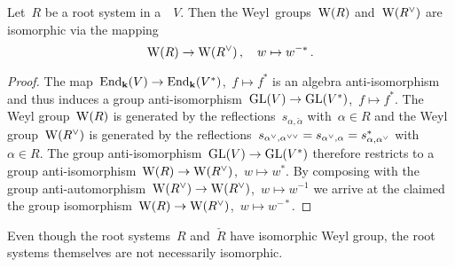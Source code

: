 \begin{lemma}
  Let~$R$ be a root system in a~{\vectorspace{$\kf$}}~$V$.
  Then the Weyl~groups~$\operatorname{W}(R)$ and~$\Weyl(\check{R})$ are isomorphic via the mapping
  \[
    \Weyl(R)
    \to
    \Weyl(\check{R}) \,,
    \quad
    w
    \mapsto
    w^{-*} \,.
  \]
\end{lemma}


\begin{proof}
  The map~$\operatorname{End}_{\mathbf{k}}(V) \to \operatorname{End}_{\mathbf{k}}(V^*)$,~$f \mapsto f^*$ is an algebra anti-isomorphism and thus induces a group anti-isomorphism~$\operatorname{GL}(V) \to \operatorname{GL}(V^*)$,~$f \mapsto f^*$.
  The Weyl group~$\operatorname{W}(R)$ is generated by the reflections~$s_{\alpha,\check{\alpha}}$ with~$\alpha \in R$ and the Weyl group~$\Weyl(\check{R})$ is generated by the reflections~$s_{\check{\alpha}, \dcheck{\alpha}} = s_{\check{\alpha}, \alpha} = s_{\alpha, \check{\alpha}}^*$ with~$\alpha \in R$.
  The group anti-isomorphism~$\operatorname{GL}(V) \to \operatorname{GL}(V^*)$ therefore restricts to a group anti-isomorphism~$\Weyl(R) \to \Weyl(\check{R})$,~$w \mapsto w^*$.
  By composing with the group anti-automorphism~$\Weyl(\check{R}) \to \Weyl(\check{R})$,~$w \mapsto w^{-1}$ we arrive at the claimed the group isomorphism~$\Weyl(R) \to \Weyl(\check{R})$,~$w \mapsto w^{-*}$.
\end{proof}


\begin{warning}
  Even though the root systems~$R$ and~$\check{R}$ have isomorphic Weyl group, the root systems themselves are not necessarily isomorphic.
\end{warning}




